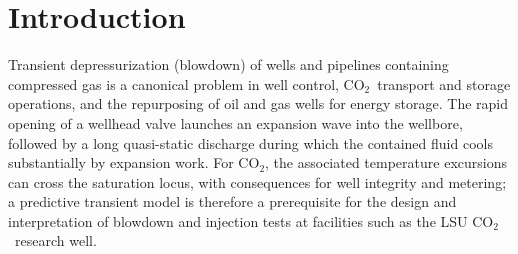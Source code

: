 \documentclass[11pt]{article}
\newcommand{\co}{CO$_2$}
\begin{document}
\begin{abstract}
\SI{300}{K} initial state the choke flashes (HEM throat quality
$0.95$--$1.0$) and the adiabatic wellbore reaches saturation at the
bottom within \SI{173}{s}, whereas with the geothermal summer
initialization and the coupled thermal model the entire system ---
wellbore and choke throat --- remains single phase for the full
one-hour transient with a minimum saturation margin of
\SI{25.6}{\degree F} (\SI{14.2}{K}). Finally, the single-phase
restriction itself is removed: a homogeneous-equilibrium (HEM)
two-phase extension, confined entirely to the thermodynamic closure
(lever-rule mixture tables with the full equilibrium two-phase sound
speed), carries the solver through in-wellbore dome entry with
machine-precision conservation, and is validated against the open
SINTEF ECCSEL pipe-depressurization data at gas-phase and dense-phase
initial conditions, with decompression-wave arrival times reproduced
essentially exactly and the known equilibrium-model deviations
(metastable delayed flashing near the exit) identified where the
literature predicts them.
\end{abstract}

\tableofcontents

\section{Introduction}

Transient depressurization (blowdown) of wells and pipelines containing
compressed gas is a canonical problem in well control, \co\ transport and
storage operations, and the repurposing of oil and gas wells for energy
storage. The rapid opening of a wellhead valve launches an expansion wave
into the wellbore, followed by a long quasi-static discharge during which
the contained fluid cools substantially by expansion work. For \co, the
associated temperature excursions can cross the saturation locus, with
consequences for well integrity and metering; a predictive transient model
is therefore a prerequisite for the design and interpretation of blowdown
and injection tests at facilities such as the LSU \co\ research well.
\end{document}
